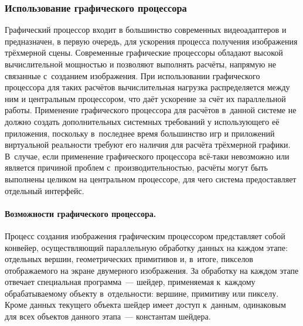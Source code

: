 \documentclass[a4paper, 14pt, titlepage]{extarticle}
\begin{document}
      \subsubsection{Использование графического процессора}\label{sssec:using_gpu}

        Графический процессор входит в большинство современных видеоадаптеров и предназначен, в
        первую очередь, для ускорения процесса получения изображения трёхмерной сцены. Современные
        графические процессоры обладают высокой вычислительной мощностью и позволяют выполнять
        расчёты, напрямую не связанные с~созданием изображения. При использовании графического
        процессора для таких расчётов вычислительная нагрузка распределяется между ним и центральным
        процессором, что даёт ускорение за счёт их параллельной работы. Применение графического
        процессора для расчётов в~данной системе не должно создать дополнительных системных
        требований у использующего её приложения, поскольку в~последнее время большинство игр и
        приложений виртуальной реальности требуют его наличия для расчёта трёхмерной графики. В~случае, если
        применение графического процессора всё-таки невозможно или является причиной проблем
        с~производительностью, расчёты могут быть выполнены целиком на центральном процессоре, для
        чего система предоставляет отдельный интерфейс.

        \paragraph{Возможности графического процессора.}
        Процесс создания изображения графическим процессором представляет собой конвейер,
        осуществляющий параллельную обработку данных на каждом этапе: отдельных вершин,
        геометрических примитивов и, в~итоге, пикселов отображаемого на экране двумерного
        изображения. За обработку на каждом этапе отвечает специальная программа~--- шейдер,
        применяемая к~каждому обрабатываемому объекту в~отдельности: вершине, примитиву или пикселу.
        Кроме данных текущего объекта шейдер имеет доступ к~данным, одинаковым для всех объектов
        данного этапа~--- константам шейдера.
\end{document}
